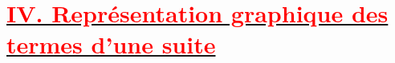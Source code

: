 \documentclass{article}
\newcounter{solution}
\begin{document}
%
%
%
%
%
%
%

\section*{\underline{\textbf{\textcolor{red}{IV. Représentation graphique des termes d'une suite}}}}
\end{document}
